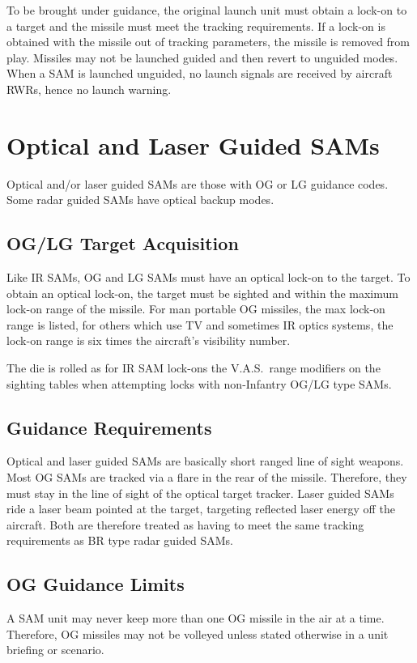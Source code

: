 To be brought under guidance, the original launch unit must obtain a lock-on to a target and the missile must meet the tracking requirements. If a lock-on is obtained with the missile out of tracking parameters, the missile is removed from play. Missiles may not be launched guided and then revert to unguided modes. When a SAM is launched unguided, no launch signals are received by aircraft RWRs, hence no launch warning.

\section{Optical and Laser Guided SAMs}

Optical and/or laser guided SAMs are those with OG or LG guidance codes. Some radar guided SAMs have optical back­up modes.

\subsection{OG/LG Target Acquisition} Like IR SAMs, OG and LG SAMs must have an optical lock-on to the target. To obtain an optical lock-on, the target must be sighted and within the maximum lock-on range of the missile. For man portable OG missiles, the max lock-on range is listed, for others which use TV and sometimes IR optics systems, the lock-on range is six times the aircraft's visibility number.

The die is rolled as for IR SAM lock-ons the V.A.S.\ range modifiers on the sighting tables when attempting locks with non-Infantry OG/LG type SAMs.

\subsection{Guidance Requirements} Optical and laser guided SAMs are basically short ranged line of sight weapons. Most OG SAMs are tracked via a flare in the rear of the missile. Therefore, they must stay in the line of sight of the optical target tracker. Laser guided SAMs ride a laser beam pointed at the target, targeting reflected laser energy off the aircraft. Both are therefore treated as having to meet the same tracking requirements as BR type radar guided SAMs.

\subsection{OG Guidance Limits} A SAM unit may never keep more than one OG missile in the air at a time. Therefore, OG missiles may not be volleyed unless stated otherwise in a unit briefing or scenario.

